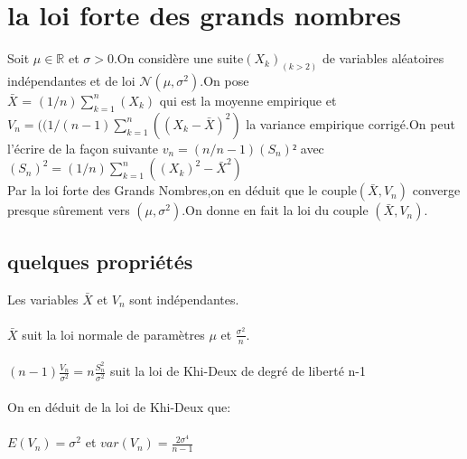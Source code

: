 \documentclass{book}
\begin{document}
     \chapter{la loi forte des grands nombres}
        Soit $\mu \in \mathbb{R}$ et $\sigma> 0$.On considère une suite$(X_k)_(k>2)$ de variables aléatoires indépendantes et de loi $\mathcal{N}(\mu,\sigma^2)$.On pose\\$\bar{X}$ = $(1/n)\sum_{k=1}^{n}(X_k)$ qui est la moyenne empirique et $V_n=((1/(n-1)\sum_{k=1}^{n}((X_k-\bar{X})^2)$ la variance empirique corrigé.On peut l'écrire de la façon suivante $v_n=(n/n-1) (S_n)²$ avec $(S_n)^2 = (1/n)\sum_{k=1}^{n}((X_k)^2-\bar{X}^2)$\\Par la loi forte des Grands Nombres,on en déduit que le couple$(\bar{X},V_n)$ converge presque sûrement vers $(\mu,\sigma^2)$.On donne en fait la loi du couple $(\bar{X},V_n)$.
      \section{quelques propriétés}
         Les variables $\bar{X}$ et $V_n$ sont indépendantes.\\\\$\bar{X}$ suit la loi normale de paramètres $\mu$ et $\frac{\sigma^2}{n}$.\\\\$(n-1)\frac{V_n}{\sigma^2}= n \frac{S_n^2}{\sigma^2}$ suit la loi de Khi-Deux de degré de liberté n-1\\\\On en déduit de la loi de Khi-Deux que:\\\\$E(V_n)=\sigma^2$ et $var(V_n)= \frac{2\sigma^4}{n-1}$
      
\end{document}
